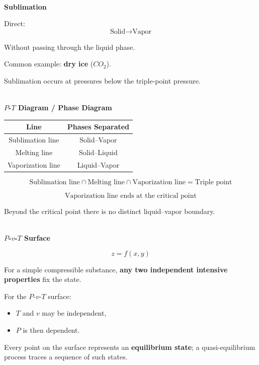 \documentclass[12pt]{article}
\begin{document}
\textbf{\\ Sublimation}

Direct:
\[
\boxed{\text{Solid}\rightarrow\text{Vapor}}
\]

Without passing through the liquid phase.

Common example: \textbf{dry ice} ($CO_2$).

Sublimation occurs at pressures below the triple-point pressure.

\textbf{\\ $P$-$T$ Diagram / Phase Diagram}

\begin{center}
\begin{tabular}{|c|c|}
\hline
\textbf{Line} & \textbf{Phases Separated}  \\
\hline
Sublimation line & Solid--Vapor  \\
\hline
Melting line & Solid--Liquid  \\
\hline
Vaporization line & Liquid--Vapor  \\
\hline
\end{tabular}
\end{center}

\[
\boxed{
\text{Sublimation line}
\cap
\text{Melting line}
\cap
\text{Vaporization line}
=
\text{Triple point}
}
\]

\[
\boxed{\text{Vaporization line ends at the critical point}}
\]

Beyond the critical point there is no distinct liquid--vapor boundary.

\textbf{\\ $P$-$v$-$T$ Surface}

\[
\boxed{z=f(x,y)}
\]

For a simple compressible substance, \textbf{any two independent intensive properties} fix the state.

For the $P$-$v$-$T$ surface:
\begin{itemize}[leftmargin=*]
    \item $T$ and $v$ may be independent,
    \item $P$ is then dependent.
\end{itemize}

Every point on the surface represents an \textbf{equilibrium state}; a quasi-equilibrium process traces a sequence of such states.
\end{document}
